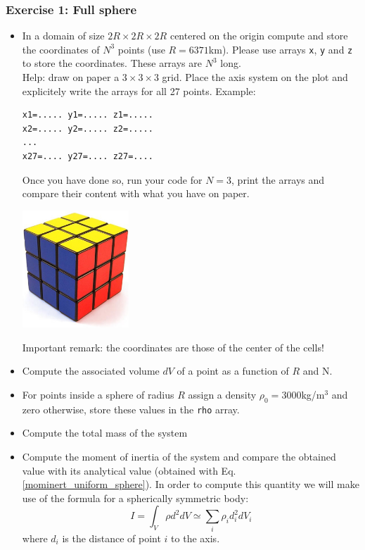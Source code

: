 \subsubsection*{Exercise 1: Full sphere}

\begin{itemize}
\item In a domain of size $2R\times 2R \times 2R$ centered on the origin compute and store the coordinates 
of $N^3$ points (use $R=6371$km). Please use arrays {\tt x}, {\tt y} and {\tt z} to store the coordinates.
These arrays are $N^3$ long.\\
Help: draw on paper a $3\times3\times3$ grid. Place the axis system on the plot and explicitely write the arrays 
for all 27 points. Example:
\begin{verbatim}
x1=..... y1=..... z1=.....
x2=..... y2=..... z2=.....
...
x27=.... y27=.... z27=....
\end{verbatim}
Once you have done so, run your code for $N=3$, print the arrays and compare their content with what you 
have on paper. \\

\begin{center}
\includegraphics[width=4cm]{images/gravity/rubik}
\end{center}

Important remark: the coordinates are those of the center of the cells!




\item Compute the associated volume $dV$ of a point as a function of $R$ and N.
\item For points inside a sphere of radius $R$ assign a density $\rho_0=3000$kg/m$^3$ and zero otherwise, store these values in the {\tt rho} array.
\item Compute the total mass of the system 
\item Compute the moment of inertia of the system and compare the obtained value with its analytical value 
(obtained with Eq. \ref{mominert_uniform_sphere}). In order to compute this quantity we will make use of
the formula for a spherically symmetric body: 
\[
I = \int_V \rho d^2 dV \simeq \sum_i \rho_i d_i^2 dV_i
\]
where $d_i$ is the distance of point $i$ to the axis.


\end{itemize}
